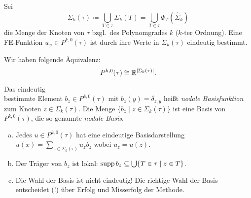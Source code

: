\documentclass[../skript.tex]{subfiles}
\begin{document}
\begin{corollary}
\label{cor:c2e3s10}
	Sei
	\[
		\Sigma_k(\tau) \coloneqq \bigcup_{T\in\tau} \Sigma_k(T) = \bigcup_{T\in\tau}\Phi_T(\hat{\Sigma}_k)
	\]
	die Menge der Knoten von $\tau$ bzgl.\ des Polynomgrades $k$ ($k$-ter Ordnung). Eine FE-Funktion $u_\varphi\in P^{k,0}(\tau)$ ist durch ihre Werte in $\Sigma_k(\tau)$ eindeutig bestimmt. 
\end{corollary}
\begin{remarknonumb}
	Wir haben folgende Äquivalenz: 
	\[
		P^{k,0}(\tau) \cong \mathbb{R}^{|\Sigma_k(\tau)|}.
	\]
\end{remarknonumb}
\begin{definition}\label{def:c2e3s11}
	Das eindeutig \\ bestimmte Element $b_z\in P^{k,0}(\tau)$ mit $b_z(y) = \delta_{z,y}$ heißt \emph{nodale Basisfunktion} zum Knoten $z\in\Sigma_k(\tau)$. Die Menge $\{b_z \mid z\in\Sigma_k(\tau)\}$ ist eine Basis von $P^{k,0}(\tau)$, die so genannte \emph{nodale Basis}.
\end{definition} 
\begin{remark}\label{rem:c2e3s12}
	\begin{enumerate}[(a)]
		\item Jedes $u\in P^{k,0}(\tau)$ hat eine eindeutige Basisdarstellung $u(x) = \sum_{z\in\Sigma_k(\tau)} u_z b_z$ wobei $u_z = u(z)$.
		\item Der Träger von $b_z$ ist lokal: $\operatorname*{supp} b_z\subseteq \bigcup\{T\in\tau \mid z\in T\}$.
		\item Die Wahl der Basis ist nicht eindeutig! Die richtige Wahl der Basis entscheidet (!) über Erfolg und Misserfolg der Methode.
	\end{enumerate}
 \end{remark}
\end{document}
